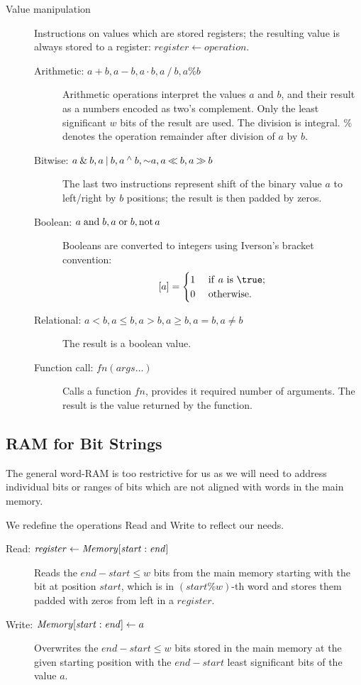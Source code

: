 \begin{description}
	\item[Value manipulation]
	Instructions on values which are stored registers; the resulting value is always stored to a register: $\mathit{register} \gets \mathit{operation}$.
	\begin{description}
		\item[Arithmetic: $a + b, a - b, a \cdot b, a \mathbin{/} b, a \% b$]
		Arithmetic operations interpret the values $a$ and $b$, and their result as a numbers encoded as two's complement.
		Only the least significant $w$ bits of the result are used.
		The division is integral. $\%$ denotes the operation remainder after division of $a$ by $b$.
		\item[Bitwise: $a \mathbin{\&} b, a \mathbin{|} b, a \mathbin{^\wedge} b, \mathord{\sim} a, a \mathbin{\ll} b, a \mathbin{\gg} b$]
		The last two instructions represent shift of the binary value $a$ to left/right by $b$ positions; the result is then padded by zeros.
		\item[Boolean: \textnormal{$a \mathrel{\textrm{and}} b, a \mathrel{\textrm{or}} b, \mathord{\textrm{not}\,} a$}]
		Booleans are converted to integers using Iverson's bracket convention:
		$$[a] = \begin{cases}
			1 & \textif a \textrm{ is } \true; \\ 
			0 & \textotherwise.
		\end{cases}$$
		\item[Relational: $a < b, a \le b, a > b, a \ge b, a = b, a \ne b$]
		The result is a boolean value.
		\item[Function call: $\mathit{fn}(\mathit{args}\ldots)$]
		Calls a function $\mathit{fn}$, provides it required number of arguments.
		The result is the value returned by the function.
	\end{description}
\end{description}

\subsection{RAM for Bit Strings}

The general word-RAM is too restrictive for us as we will need to address individual bits or ranges of bits which are not aligned with words in the main memory.

We redefine the operations Read and Write to reflect our needs.
\begin{description}
	\item[Read: $\mathit{register} \gets \mathit{Memory}[\mathit{start}:\mathit{end}\char93$]
	Reads the $\mathit{end} - \mathit{start} \le w$ bits from the main memory starting with the bit at position $\mathit{start}$, which is in $(\mathit{start} \% w)$-th word and stores them padded with zeros from left in a $register$.
	
	\item[Write: $\mathit{Memory}[\mathit{start}:\mathit{end}\char93 \gets a$]
	Overwrites the $\mathit{end} - \mathit{start} \le w$ bits stored in the main memory at the given starting position with the $\mathit{end} - \mathit{start}$ least significant bits of the value $a$.
\end{description}

